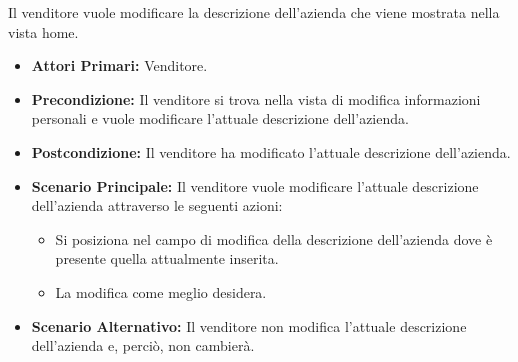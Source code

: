 Il venditore vuole modificare la descrizione dell'azienda che viene mostrata nella vista home.
\begin{itemize}
    \item \textbf{Attori Primari:} Venditore.
    \item \textbf{Precondizione:} Il venditore si trova nella vista di modifica informazioni personali e vuole modificare l'attuale descrizione dell'azienda.
    \item \textbf{Postcondizione:} Il venditore ha modificato l'attuale descrizione dell'azienda.
    \item \textbf{Scenario Principale:} Il venditore vuole modificare l'attuale descrizione dell'azienda attraverso le seguenti azioni:
    \begin{itemize}
        \item Si posiziona nel campo di modifica della descrizione dell'azienda dove è presente quella attualmente inserita.
        \item La modifica come meglio desidera.
    \end{itemize}
    \item \textbf{Scenario Alternativo:} Il venditore non modifica l'attuale descrizione dell'azienda e, perciò, non cambierà.
\end{itemize}
